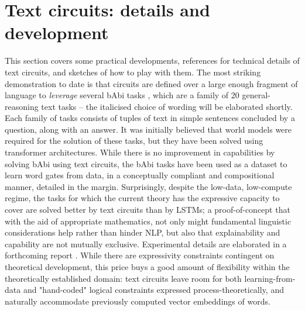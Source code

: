 \section{Text circuits: details and development}\label{sec:circs}


This section covers some practical developments, references for technical details of text circuits, and sketches of how to play with them. The most striking demonstration to date is that circuits are defined over a large enough fragment of language to \emph{leverage} several bAbi tasks \citep{noauthor_babi_nodate}, which are a family of 20 general-reasoning text tasks -- the italicised choice of wording will be elaborated shortly. Each family of tasks consists of tuples of text in simple sentences concluded by a question, along with an answer. It was initially believed that world models were required for the solution of these tasks, but they have been solved using transformer architectures. While there is no improvement in capabilities by solving bAbi using text circuits, the bAbi tasks have been used as a dataset to learn word gates from data, in a conceptually compliant and compositional manner, detailed in the margin. Surprisingly, despite the low-data, low-compute regime, the tasks for which the current theory has the expressive capacity to cover are solved better by text circuits than by LSTMs; a proof-of-concept that with the aid of appropriate mathematics, not only might fundamental linguistic considerations help rather than hinder NLP, but also that explainability and capability are not mutually exclusive. Experimental details are elaborated in a forthcoming report \citep{anonymous_quantinuum_researchers_discocirc_nodate}. While there are expressivity constraints contingent on theoretical development, this price buys a good amount of flexibility within the theoretically established domain: text circuits leave room for both learning-from-data and "hand-coded" logical constraints expressed process-theoretically, and naturally accommodate previously computed vector embeddings of words.\\

